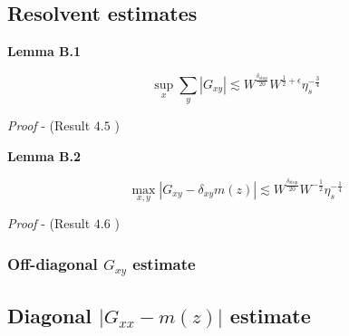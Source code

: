 \documentclass[11pt]{article}
\newenvironment{boxt}[1]
  {\begin{mdframed}\noindent\textbf{#1}\normalfont\space}
  {\end{mdframed}}
\newcommand{\sto}{\text{stop}}
\begin{document}
\subsection*{Resolvent estimates}


\begin{boxt}{Lemma B.1} \label{lemma-b1}


$$\sup_x \sum_y |G_{xy}|\lesssim W^{\frac{\delta_\sto}{20}}W^{\frac{1}{2}+\epsilon} \eta_s^{-\frac{3}{4}}$$
\end{boxt}
\textit{Proof} - (Result $4.5$ \cite{bandSDE})

\begin{boxt}{Lemma B.2} \label{lemma-b2}

$$\max_{x, y} |G_{xy} - \delta_{xy}m(z)|\lesssim W^{\frac{\delta_\sto}{20}}W^{-\frac{1}{2}} \eta_s^{-\frac{1}{4}}
$$
\end{boxt}
\textit{Proof} - (Result $4.6$ \cite{bandSDE})


\subsubsection*{Off-diagonal $G_{xy}$ estimate}

\subsection*{Diagonal $|G_{xx}-m(z)|$ estimate}
\end{document}
